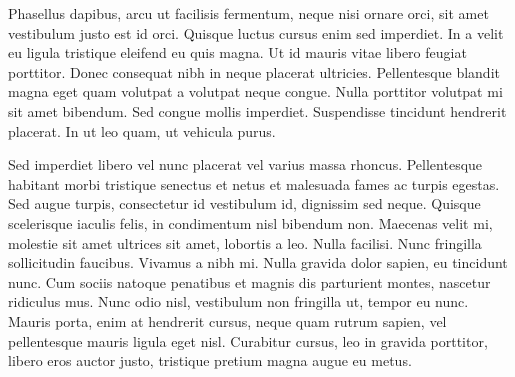 Phasellus dapibus, arcu ut facilisis fermentum, neque nisi ornare orci, sit amet vestibulum justo est id orci. Quisque luctus cursus enim sed imperdiet. In a velit eu ligula tristique eleifend eu quis magna. Ut id mauris vitae libero feugiat porttitor. Donec consequat nibh in neque placerat ultricies. Pellentesque blandit magna eget quam volutpat a volutpat neque congue. Nulla porttitor volutpat mi sit amet bibendum. Sed congue mollis imperdiet. Suspendisse tincidunt hendrerit placerat. In ut leo quam, ut vehicula purus.

Sed imperdiet libero vel nunc placerat vel varius massa rhoncus. Pellentesque habitant morbi tristique senectus et netus et malesuada fames ac turpis egestas. Sed augue turpis, consectetur id vestibulum id, dignissim sed neque. Quisque scelerisque iaculis felis, in condimentum nisl bibendum non. Maecenas velit mi, molestie sit amet ultrices sit amet, lobortis a leo. Nulla facilisi. Nunc fringilla sollicitudin faucibus. Vivamus a nibh mi. Nulla gravida dolor sapien, eu tincidunt nunc. Cum sociis natoque penatibus et magnis dis parturient montes, nascetur ridiculus mus. Nunc odio nisl, vestibulum non fringilla ut, tempor eu nunc. Mauris porta, enim at hendrerit cursus, neque quam rutrum sapien, vel pellentesque mauris ligula eget nisl. Curabitur cursus, leo in gravida porttitor, libero eros auctor justo, tristique pretium magna augue eu metus.